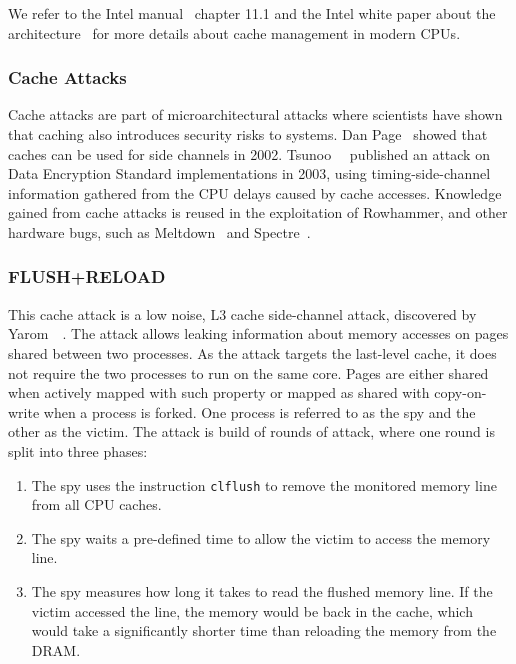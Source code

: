 We refer to the Intel manual~\cite{intelsys} chapter 11.1 and the Intel white
paper about the architecture~\cite{intelwhite} for more details about cache
management in modern CPUs.

\subsubsection{Cache Attacks}

Cache attacks are part of microarchitectural attacks where scientists have
shown that caching also introduces security risks to systems. Dan
Page~\cite{firstcacheside} showed that caches can be used for side channels in
2002. Tsunoo~\etal~\cite{firstcacheDES} published an attack on Data Encryption
Standard implementations in 2003, using timing-side-channel information gathered
from the CPU delays caused by cache accesses. Knowledge gained from cache
attacks is reused in the exploitation of Rowhammer, and other hardware bugs,
such as Meltdown~\cite{meltdown} and Spectre~\cite{spectre}.

\subsubsection{FLUSH+RELOAD}

This cache attack is a low noise, L3 cache side-channel attack, discovered by
Yarom~\etal~\cite{flushreload}. The attack allows leaking information about
memory accesses on pages shared between two processes. As the attack targets the
last-level cache, it does not require the two processes to run on the same core.
Pages are either shared when actively mapped with such property or mapped as
shared with copy-on-write when a process is forked. One process is referred to
as the spy and the other as the victim. The attack is build of rounds of attack,
where one round is split into three phases:

\begin{enumerate}
\item The spy uses the instruction \texttt{clflush} to remove the monitored
memory line from all CPU caches.
\item The spy waits a pre-defined time to allow the victim to access the memory
line.
\item The spy measures how long it takes to read the flushed memory line. If the
victim accessed the line, the memory would be back in the cache, which would
take a significantly shorter time than reloading the memory from the DRAM.
\end{enumerate}

